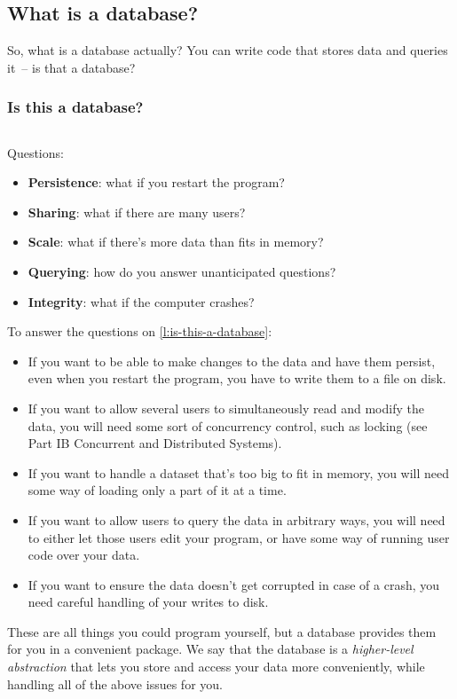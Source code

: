 \subsection{What is a database?}\label{sec:what-is-database}

So, what is a database actually?
You can write code that stores data and queries it~-- is that a database?

\begin{frame}
    \label{s:is-this-a-database}
    \frametitle{Is this a database?}
    \inputminted[fontsize=\footnotesize]{python}{code/movies-python.py}\vspace{1em}\pause
    Questions:
    \begin{itemize}
        \item \textbf{Persistence}: what if you restart the program?\pause
        \item \textbf{Sharing}: what if there are many users?\pause
        \item \textbf{Scale}: what if there's more data than fits in memory?\pause
        \item \textbf{Querying}: how do you answer unanticipated questions?\pause
        \item \textbf{Integrity}: what if the computer crashes?
    \end{itemize}
\end{frame}
\label{l:is-this-a-database}

To answer the questions on \autoref{l:is-this-a-database}:
\begin{itemize}
    \item If you want to be able to make changes to the data and have them persist, even when you restart the program, you have to write them to a file on disk.
    \item If you want to allow several users to simultaneously read and modify the data, you will need some sort of concurrency control, such as locking (see Part IB Concurrent and Distributed Systems).
    \item If you want to handle a dataset that's too big to fit in memory, you will need some way of loading only a part of it at a time.
    \item If you want to allow users to query the data in arbitrary ways, you will need to either let those users edit your program, or have some way of running user code over your data.
    \item If you want to ensure the data doesn't get corrupted in case of a crash, you need careful handling of your writes to disk.
\end{itemize}
These are all things you could program yourself, but a database provides them for you in a convenient package.
We say that the database is a \emph{higher-level abstraction} that lets you store and access your data more conveniently, while handling all of the above issues for you.

